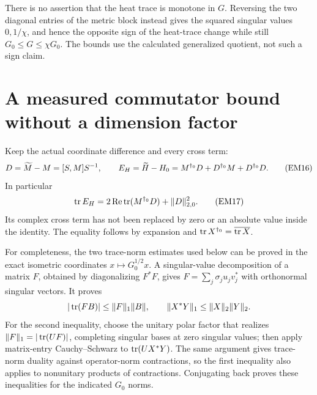 There is no assertion that the heat trace is monotone in \(G\). Reversing
the two diagonal entries of the metric block instead gives the squared
singular values \(0,1/\chi\), and hence the opposite sign of the
heat-trace change while still \(G_0\le G\le\chi G_0\).
The bounds use the calculated generalized quotient, not such a sign claim.

\section{A measured commutator bound without a dimension factor}

Keep the actual coordinate difference and every cross term:
\begin{equation}
 D=\widetilde M-M=[S,M]S^{-1},\qquad
 E_H=\widetilde H-H_0=M^{\dagger_0}D+D^{\dagger_0}M+D^{\dagger_0}D.
 \tag{EM16}\label{hem:EM16}
\end{equation}
In particular
\begin{equation}
 \operatorname{tr} E_H=2\operatorname{Re}\operatorname{tr}(M^{\dagger_0}D)+\|D\|_{2,0}^2.
 \tag{EM17}\label{hem:EM17}
\end{equation}
Its complex cross term has not been replaced by zero or an absolute value
inside the identity. The equality follows by expansion and
\(\operatorname{tr} X^{\dagger_0}=\overline{\operatorname{tr} X}\).

For completeness, the two trace-norm estimates used below can be proved
in the exact isometric coordinates \(x\mapsto G_0^{1/2}x\). A singular-value
decomposition of a matrix \(F\), obtained by diagonalizing \(F^*F\),
gives \(F=\sum_j\sigma_j u_jv_j^*\) with orthonormal singular vectors.
It proves
\[
 |\operatorname{tr}(FB)|\le\|F\|_1\|B\|,\qquad
 \|X^*Y\|_1\le\|X\|_2\|Y\|_2.
\]
For the second inequality, choose the unitary polar factor that realizes
\(\|F\|_1=|\operatorname{tr}(UF)|\), completing singular bases at zero singular values;
then apply matrix-entry Cauchy--Schwarz to
\(\operatorname{tr}(UX^*Y)\). The same argument gives trace-norm duality against
operator-norm contractions, so the first inequality also applies to
nonunitary products of contractions. Conjugating back proves these
inequalities for the indicated \(G_0\) norms.

